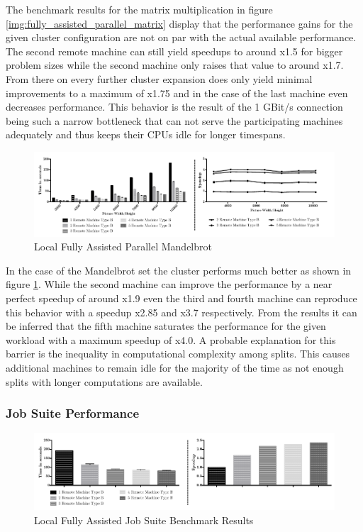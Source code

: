 The benchmark results for the matrix multiplication in figure \ref{img:fully_assisted_parallel_matrix} display that the performance gains for the given cluster configuration are not on par with the actual available performance. The second remote machine can still yield speedups to around x1.5 for bigger problem sizes while the second machine only raises that value to around x1.7. From there on every further cluster expansion does only yield minimal improvements to a maximum of x1.75 and in the case of the last machine even decreases performance. This behavior is the result of the 1 GBit/s connection being such a narrow bottleneck that can not serve the participating machines adequately and thus keeps their CPUs idle for longer timespans.

\begin{figure}[!htb]

	\includegraphics[width=1.0\textwidth]{images/local_fully_assisted_mandelbrot.pdf}
	\centering
	\caption{Local Fully Assisted Parallel Mandelbrot}
	\label{img:fully_assisted_parallel_mandelbrot}
\end{figure}

In the case of the Mandelbrot set the cluster performs much better as shown in figure \ref{img:fully_assisted_parallel_mandelbrot}. While the second machine can improve the performance by a near perfect speedup of around x1.9 even the third and fourth machine can reproduce this behavior with a speedup x2.85 and x3.7 respectively. From the results it can be inferred that the fifth machine saturates the performance for the given workload with a maximum speedup of x4.0. A probable explanation for this barrier is the inequality in computational complexity among splits. This causes additional machines to remain idle for the majority of the time as not enough splits with longer computations are available.

\subsubsection*{Job Suite Performance}

\begin{figure}[!htb]

	\includegraphics[width=1.0\textwidth]{images/local_fully_assisted_full_benchmark.pdf}
	\centering
	\caption{Local Fully Assisted Job Suite Benchmark Results}
	\label{img:local_fully_assisted_benchmark_results}
\end{figure}

